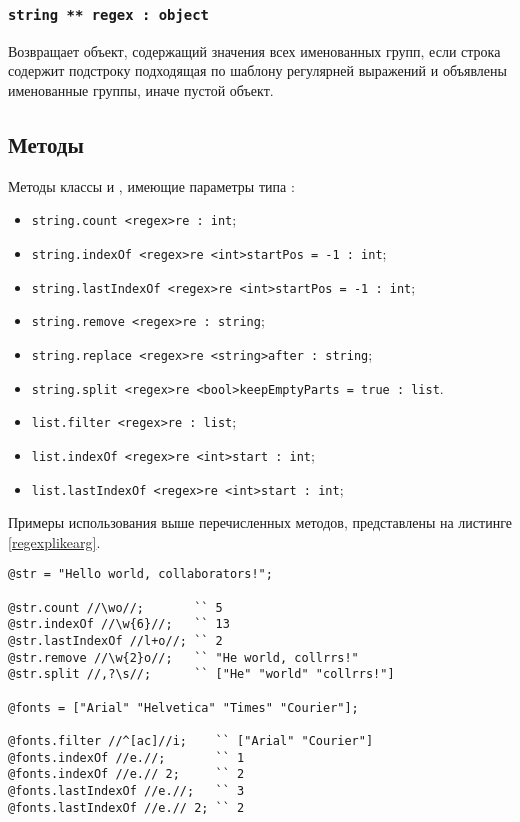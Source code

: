 \documentclass[a4paper, 14pt]{extarticle}
\newenvironment{icItems}
	{ \begin{itemize} [noitemsep,nolistsep] }
	{ \end{itemize} }
\begin{document}
\subsubsection{\lstinline|string ** regex : object|}

Возвращает объект, содержащий значения всех именованных групп, если строка содержит подстроку подходящая по шаблону регулярней выражений и объявлены именованные группы, иначе пустой объект.


\subsection{Методы}

Методы классы \str{} и \listtype, имеющие параметры типа \regex{}:
\begin{icItems}
\item
	\lstinline|string.count <regex>re : int|;
\item
	\lstinline|string.indexOf <regex>re <int>startPos = -1 : int|;
\item
	\lstinline|string.lastIndexOf <regex>re <int>startPos = -1 : int|;
\item
	\lstinline|string.remove <regex>re : string|;
\item 
	\lstinline|string.replace <regex>re <string>after : string|;
\item
	\lstinline|string.split <regex>re <bool>keepEmptyParts = true : list|.
\item
	\lstinline|list.filter <regex>re : list|;
\item
	\lstinline|list.indexOf <regex>re <int>start : int|;
\item
	\lstinline|list.lastIndexOf <regex>re <int>start : int|;
\end{icItems}

Примеры использования выше перечисленных методов, представлены на листинге \ref{regexplikearg}.

\begin{lstlisting}[caption=Регулярные выражения в качестве аргумента, label=regexplikearg]
@str = "Hello world, collaborators!";

@str.count //\wo//;       `` 5
@str.indexOf //\w{6}//;   `` 13
@str.lastIndexOf //l+o//; `` 2
@str.remove //\w{2}o//;   `` "He world, collrrs!"
@str.split //,?\s//;      `` ["He" "world" "collrrs!"]

@fonts = ["Arial" "Helvetica" "Times" "Courier"];

@fonts.filter //^[ac]//i;    `` ["Arial" "Courier"]
@fonts.indexOf //e.//;       `` 1
@fonts.indexOf //e.// 2;     `` 2
@fonts.lastIndexOf //e.//;   `` 3
@fonts.lastIndexOf //e.// 2; `` 2
\end{lstlisting}
\end{document}
